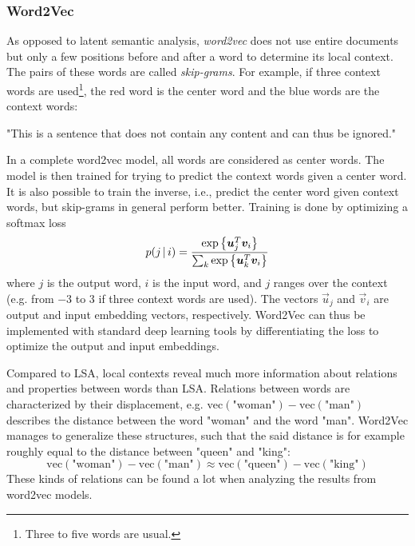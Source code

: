 			\subsubsection{Word2Vec}
				As opposed to latent semantic analysis, \emph{word2vec} does not use entire documents but only a few positions before and after a word to determine its local context. The pairs of these words are called \emph{skip-grams}. For example, if three context words are used\footnote{Three to five words are usual.}, the {\color{TUDa-9b} red} word is the center word and the {\color{TUDa-1b} blue} words are the context words:
				\begin{center}
					"This is a sentence {\color{TUDa-1b} that does not} {\color{TUDa-9b} contain} {\color{TUDa-1b} any content and} can thus be ignored."
				\end{center}
				In a complete word2vec model, all words are considered as center words. The model is then trained for trying to predict the context words given a center word. It is also possible to train the inverse, i.e., predict the center word given context words, but skip-grams in general perform better. Training is done by optimizing a softmax loss
				\begin{equation}
					p(j \,\vert\, i) = \frac{\exp\big\{ \bm{u}_j^T \bm{v}_i \big\}}{\sum_k \exp\big\{ \bm{u}_k^T \bm{v}_i \big\}}
				\end{equation}
				where \(j\) is the output word, \(i\) is the input word, and \(j\) ranges over the context (e.g. from \num{-3} to \num{+3} if three context words are used). The vectors \(\vec{u}_j\) and \(\vec{v}_i\) are output and input embedding vectors, respectively. Word2Vec can thus be implemented with standard deep learning tools by differentiating the loss to optimize the output and input embeddings.

				Compared to LSA, local contexts reveal much more information about relations and properties between words than LSA. Relations between words are characterized by their displacement, e.g. \( \mathrm{vec}(\text{"woman"}) - \mathrm{vec}(\text{"man"}) \) describes the distance between the word "woman" and the word "man". Word2Vec manages to generalize these structures, such that the said distance is for example roughly equal to the distance between "queen" and "king":
				\begin{equation}
					\mathrm{vec}(\text{"woman"}) - \mathrm{vec}(\text{"man"}) \approx \mathrm{vec}(\text{"queen"}) - \mathrm{vec}(\text{"king"})
				\end{equation}
				These kinds of relations can be found a lot when analyzing the results from word2vec models.

